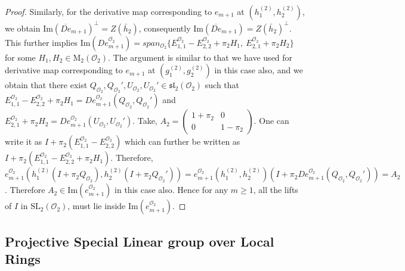 \documentclass[10pt,twoside]{amsart}
\newcommand{\SL}{\mathrm{SL}}
\newcommand{\M}{\mathrm{M}}
\newcommand{\im}{\mathrm{Im}}
\theoremstyle{definition}
\theoremstyle{definition}
\begin{document}
\begin{proof}
Similarly, for the derivative map corresponding to $e_{m+1}$ at $(h_1^{(2)}, h_2^{(2)})$, we obtain $\im (\overline{De}_{m+1})^{\perp} = Z(\bar h_2)$, consequently $\im (\overline{De}_{m+1}) = Z(\bar h_2)^{\perp}$. This further implies $\im(De_{m+1}^{\mathcal{O}_2}) = span_{\mathcal{O}_2} \{E^{\mathcal{O}_2}_{1,1} -E_{2,2}^{\mathcal{O}_2} + \pi_2H_1, \ E^{\mathcal{O}_2}_{2,1} + \pi_2H_2\}$ for some $H_1, H_2\in \M_2(\mathcal{O}_2)$. The argument is similar to that we have used for derivative map corresponding to $e_{m+1}$ at $(g_1^{(2)}, g_2^{(2)})$ in this case also, and we obtain that there exist $Q_{\mathcal{O}_2}, Q_{\mathcal{O}_2}', U_{\mathcal{O}_2}, U_{\mathcal{O}_2}' \in \mathfrak{sl}_2(\mathcal{O}_2)$ such that $E_{1,1}^{\mathcal{O}_2}-E_{2,2}^{\mathcal{O}_2} + \pi_2H_1 = De_{m+1}^{\mathcal{O}_2}(Q_{\mathcal{O}_2}, Q_{\mathcal{O}_2}')$ and  $E_{2,1}^{\mathcal{O}_2} + \pi_2H_2 = De_{m+1}^{\mathcal{O}_2}(U_{\mathcal{O}_2}, U_{\mathcal{O}_2}')$. Take, $A_2=\left(\begin{array}{cc} 1 + \pi_2 & 0 \\ 0 & 1-\pi_2 \end{array}\right)$. One can write it as $I + \pi_2(E_{1,1}^{\mathcal{O}_2} -E_{2,2}^{\mathcal{O}_2})$ which can further be written as $I + \pi_2(E_{1,1}^{\mathcal{O}_2} -E_{2,2}^{\mathcal{O}_2} + \pi_2H_1)$. Therefore, $e_{m+1}^{\mathcal{O}_2}(h_1^{(2)}(I + \pi_2Q_{\mathcal{O}_2}), h_2^{(2)}(I + \pi_2Q_{\mathcal{O}_2}')) = e_{m+1}^{\mathcal{O}_2}(h_1^{(2)}, h_2^{(2)})\left(I + \pi_2De_{m+1}^{\mathcal{O}_2}(Q_{\mathcal{O}_2}, Q_{\mathcal{O}_2}')\right) = A_2$. Therefore $A_2\in \im(e_{m+1}^{\mathcal{O}_2})$ in this case also. Hence for any $m\geq 1$, all the lifts of $I$ in $\SL_2(\mathcal{O}_2)$, must lie inside $\im(e_{m+1}^{\mathcal{O}_2})$.
\end{proof}


\subsection{Projective Special Linear group over Local Rings }
\end{document}
